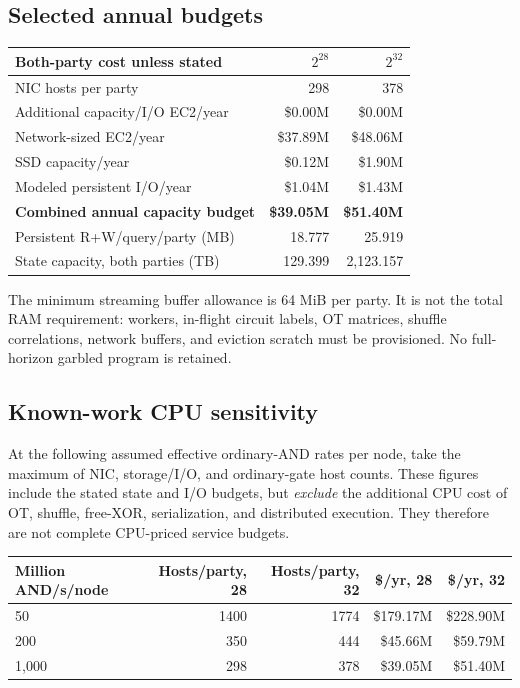 \subsection{Selected annual budgets}
\begin{center}\small
\begin{tabular}{lrr}\toprule
Both-party cost unless stated & $2^{28}$ & $2^{32}$\\\midrule
NIC hosts per party & 298 & 378\\
Additional capacity/I/O EC2/year & \$0.00M & \$0.00M\\
Network-sized EC2/year & \$37.89M & \$48.06M\\
SSD capacity/year & \$0.12M & \$1.90M\\
Modeled persistent I/O/year & \$1.04M & \$1.43M\\
\textbf{Combined annual capacity budget} & \textbf{\$39.05M} & \textbf{\$51.40M}\\
Persistent R+W/query/party (MB) & 18.777 & 25.919\\
State capacity, both parties (TB) & 129.399 & 2,123.157\\
\bottomrule\end{tabular}
\end{center}

The minimum streaming buffer allowance is 64 MiB per
party. It is not the total RAM requirement: workers, in-flight circuit labels,
OT matrices, shuffle correlations, network buffers, and eviction scratch must
be provisioned. No full-horizon garbled program is retained.

\subsection{Known-work CPU sensitivity}
At the following assumed effective ordinary-AND rates per node, take the
maximum of NIC, storage/I/O, and ordinary-gate host counts. These figures
include the stated state and I/O budgets, but \emph{exclude} the additional
CPU cost of OT, shuffle, free-XOR, serialization, and distributed execution.
They therefore are not complete CPU-priced service budgets.

\begin{center}\small
\begin{tabular}{lrrrr}\toprule
Million AND/s/node & Hosts/party, 28 & Hosts/party, 32 & \$/yr, 28 & \$/yr, 32\\\midrule
50 & 1400 & 1774 & \$179.17M & \$228.90M\\
200 & 350 & 444 & \$45.66M & \$59.79M\\
1,000 & 298 & 378 & \$39.05M & \$51.40M\\
\bottomrule\end{tabular}
\end{center}

